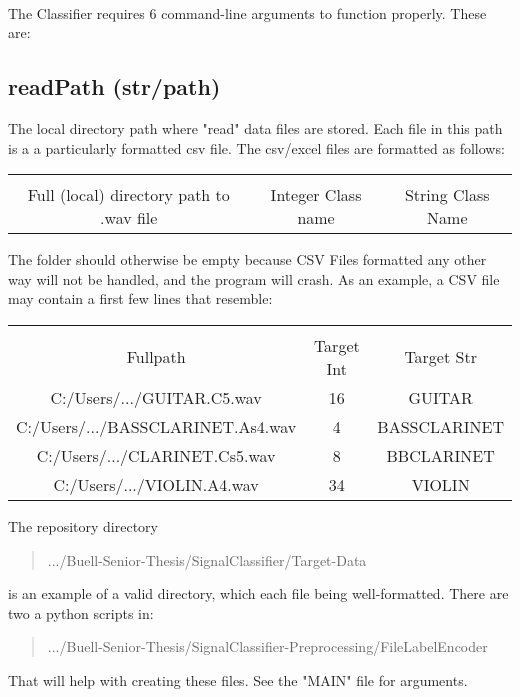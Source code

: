 \documentclass[12pt,letterpaper]{article}
\begin{document}
\paragraph*{}The Classifier requires 6 command-line arguments to function properly. These are:


\subsection{readPath (str/path)}
The local directory path where "read" data files are stored. Each file in this path is a a particularly formatted csv file. The csv/excel files are formatted as follows:

\begin{center}
\begin{tabular}{|c|c|c|}
\hline \\
Full (local) directory path to .wav file & Integer Class name & String Class Name \\
\hline
\end{tabular}
\end{center}

The folder should otherwise be empty because CSV Files formatted any other way will not be handled, and the program will crash. As an example, a CSV file may contain a first few lines that resemble:

\begin{center}
\begin{tabular}{|c|c|c|}
\hline \\
Fullpath	 & Target Int & Target Str \\ \hline
C:/Users/.../GUITAR.C5.wav	 
& 16 & GUITAR \\ \hline
C:/Users/.../BASSCLARINET.As4.wav 
& 4 & BASSCLARINET \\ \hline
C:/Users/.../CLARINET.Cs5.wav 
& 8 & BBCLARINET \\ \hline
C:/Users/.../VIOLIN.A4.wav	
& 34 & VIOLIN  \\ \hline
\end{tabular}
\end{center}

The repository directory
\begin{quote}
.../Buell-Senior-Thesis/SignalClassifier/Target-Data
\end{quote}
is an example of a valid directory, which each file  being well-formatted. There are two a python scripts in:
\begin{quote}
.../Buell-Senior-Thesis/SignalClassifier-Preprocessing/FileLabelEncoder
\end{quote}
That will help with creating these files. See the "MAIN" file for arguments.
\end{document}
